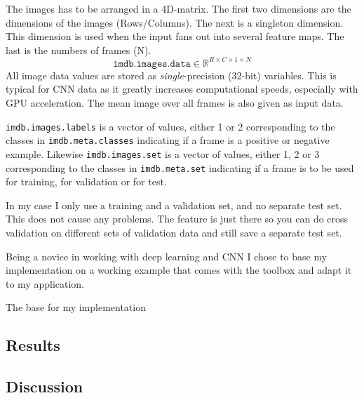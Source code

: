 \documentclass[Main]{subfiles}
\begin{document}
				The images has to be arranged in a 4D-matrix.
				The first two dimensions are the dimensions of the images (Rows/Columns).
				The next is a singleton dimension.
				This dimension is used when the input fans out into several feature maps.
				The last is the numbers of frames (N).
				\begin{equation}
					\texttt{imdb.images.data} \in \mathbb{R}^{R\times C\times1\times N} 
				\end{equation}
				All image data values are stored as \emph{single}-precision (32-bit) variables.
				This is typical for CNN data as it greatly increases computational speeds, especially with GPU acceleration.
				The mean image over all frames is also given as input data.

				\texttt{imdb.images.labels} is a vector of values, either 1 or 2 corresponding to the classes in \texttt{imdb.meta.classes} indicating if a frame is a positive or negative example.
				Likewise \texttt{imdb.images.set} is a vector of values, either 1, 2  or 3 corresponding to the classes in \texttt{imdb.meta.set} indicating if a frame is to be used for training, for validation or for test.

				In my case I only use a training and a validation set, and no separate test set.
				This does not cause any problems.
				The feature is just there so you can do cross validation on different sets of validation data and still save a separate test set.


				

			Being a novice in working with deep learning and CNN I chose to base my implementation on a working example that comes with the toolbox and adapt it to my application.

			The base for my implementation 



		

	


	\subsection{Results} %
		\label{sub:cnn_results}



		


	\subsection{Discussion} %
		\label{sub:cnn_discussion}
		


	
\end{document}
